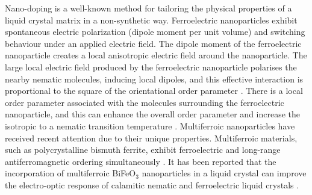 \documentclass[reprint,amsfonts,amsmath,amssymb,aps,pre,floatfix,10pt]{revtex4-1}
\begin{document}
Nano-doping is a well-known method for tailoring the physical properties of a liquid crystal matrix in a non-synthetic way. Ferroelectric nanoparticles exhibit spontaneous electric polarization (dipole moment per unit volume) and switching behaviour under an applied electric field. The dipole moment of the ferroelectric nanoparticle creates a local anisotropic electric field around the nanoparticle. The large local electric field produced by the ferroelectric nanoparticle polarises the nearby nematic molecules, inducing local dipoles, and this effective interaction is proportional to the square of the orientational order parameter \cite{li2006orientational_14}. There is a local order parameter associated with the molecules surrounding the ferroelectric nanoparticle, and this can enhance the overall order parameter and increase the isotropic to a nematic transition temperature \cite{lopatina2009theory_13}. Multiferroic nanoparticles have received recent attention due to their unique properties. Multiferroic materials, such as polycrystalline bismuth ferrite, exhibit ferroelectric and long-range antiferromagnetic ordering simultaneously \cite{kalinin2002potential_15,seidel2009conduction_16}. It has been reported that the incorporation of multiferroic BiFeO$_{3}$ nanoparticles in a liquid crystal can improve the electro-optic response of calamitic nematic and ferroelectric liquid crystals \cite{nayek2015superior_17, khan2020bismuth_18, ghosh2011effect_19}. 
\end{document}
